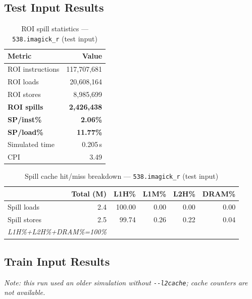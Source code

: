 \documentclass[11pt,a4paper]{article}
\begin{document}
\subsection{Test Input Results}

\begin{table}[H]
\centering
\caption{ROI spill statistics --- \texttt{538.imagick\_r} (test input)}
\label{tab:imagick_test_roi}
\begin{tabular}{lr}
\toprule
\textbf{Metric} & \textbf{Value} \\
\midrule
ROI instructions & 117,707,681 \\
ROI loads        & 20,608,164 \\
ROI stores       & 8,985,699 \\
\textbf{ROI spills}   & \textbf{2,426,438} \\
\textbf{SP/inst\%}   & \textbf{2.06\%} \\
\textbf{SP/load\%}   & \textbf{11.77\%} \\
Simulated time   & 0.205\,s \\
CPI              & 3.49 \\
\bottomrule
\end{tabular}
\end{table}

\begin{table}[H]
\centering
\caption{Spill cache hit/miss breakdown --- \texttt{538.imagick\_r} (test input)}
\label{tab:imagick_test_cache}
\begin{tabular}{lrrrrr}
\toprule
\textbf{} & \textbf{Total (M)} & \textbf{L1H\%} & \textbf{L1M\%} & \textbf{L2H\%} & \textbf{DRAM\%} \\
\midrule
Spill loads  & 2.4 & 100.00 & 0.00 & 0.00 & 0.00 \\
Spill stores & 2.5 & 99.74 & 0.26 & 0.22 & 0.04 \\
\multicolumn{2}{l}{\small\textit{L1H\%+L2H\%+DRAM\%=100\%}} \\
\bottomrule
\end{tabular}
\end{table}

\subsection{Train Input Results}

\textit{Note: this run used an older simulation without \texttt{-{}-l2cache}; cache counters are not available.}
\end{document}
